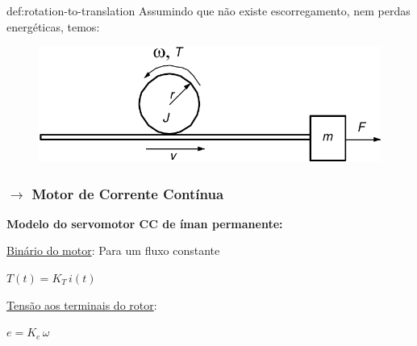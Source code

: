 \begin{theo}{def:rotation-to-translation}\label{def:rotation-to-translation}
Assumindo que não existe escorregamento, nem perdas energéticas, temos:
\begin{figure}[H]
    \centering
    \begin{minipage}{0.6\linewidth}
        \includegraphics[width = 1\linewidth]{img/1/convertion.png} \label{fig:convertion}
    \end{minipage}
    \hfill
\end{figure}
\end{theo}

\newpage
\subsubsection[2.2.3 Motor Corrente Contínua]{$\pmb{\rightarrow}$ Motor de Corrente Contínua}
\begin{mdframed}
\textbf{Modelo do servomotor CC de íman permanente:}

\noindent\underline{Binário do motor}: Para um fluxo constante

\noindent \hspace*{1.5 em}\raisebox{0.2 em}{$\drsh$} $T(t) = K_T\, i(t)$

\vspace{0.5em}
\noindent\underline{Tensão aos terminais do rotor}: 

\noindent \hspace*{1.5 em}\raisebox{0.2 em}{$\drsh$} $e = K_e\, \omega$

\end{mdframed}
